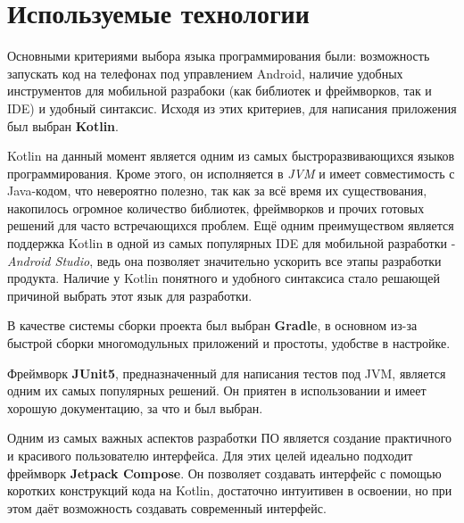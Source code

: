\section{Используемые технологии}
Основными критериями выбора языка программирования были: возможность запускать код на телефонах под управлением Android, наличие удобных инструментов для мобильной разрабоки (как библиотек и фреймворков, так и IDE) и удобный синтаксис. Исходя из этих критериев, для написания приложения был выбран \textbf{Kotlin}.\par
Kotlin на данный момент является одним из самых быстроразвивающихся языков программирования\cite{Github}. Кроме этого, он исполняется в \emph{JVM} и имеет совместимость с Java-кодом, что невероятно полезно, так как за всё время их существования, накопилось огромное количество библиотек, фреймворков и прочих готовых решений для часто встречающихся проблем. Ещё одним преимуществом является поддержка Kotlin в одной из самых популярных IDE для мобильной разработки - \emph{Android Studio}, ведь она позволяет значительно ускорить все этапы разработки продукта. Наличие у Kotlin понятного и удобного синтаксиса стало решающей причиной выбрать этот язык для разработки.\par
В качестве системы сборки проекта был выбран \textbf{Gradle}, в основном из-за быстрой сборки многомодульных приложений и простоты, удобстве в настройке.\par
Фреймворк \textbf{JUnit5}, предназначенный для написания тестов под JVM, является одним их самых популярных решений. Он приятен в использовании и имеет хорошую документацию, за что и был выбран.\par
Одним из самых важных аспектов разработки ПО является создание практичного и красивого пользователю интерфейса. Для этих целей идеально подходит фреймворк \textbf{Jetpack Compose}. Он позволяет создавать интерфейс с помощью коротких конструкций кода на Kotlin, достаточно интуитивен в освоении, но при этом даёт возможность создавать современный интерфейс.
